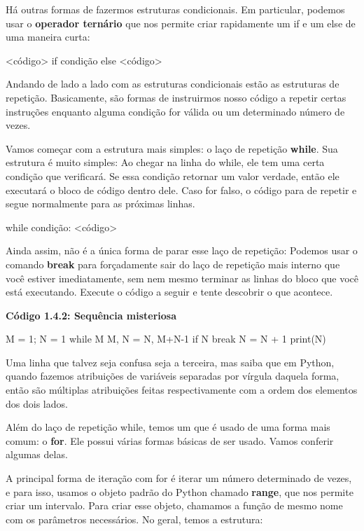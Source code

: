 \documentclass[11pt, a4paper]{article}
\begin{document}
Há outras formas de fazermos estruturas condicionais. Em particular, podemos usar o \textbf{operador ternário} que nos permite criar rapidamente um if e um else de uma maneira curta:

\begin{code}
<código> if condição else <código>
\end{code}

Andando de lado a lado com as estruturas condicionais estão as estruturas de repetição. Basicamente, são formas de instruirmos nosso código a repetir certas instruções enquanto alguma condição for válida ou um determinado número de vezes.

Vamos começar com a estrutura mais simples: o laço de repetição \textbf{while}. Sua estrutura é muito simples: Ao chegar na linha do while, ele tem uma certa condição que verificará. Se essa condição retornar um valor verdade, então ele executará o bloco de código dentro dele. Caso for falso, o código para de repetir e segue normalmente para as próximas linhas.

\begin{code}
while condição:
    <código>
\end{code}

Ainda assim, não é a única forma de parar esse laço de repetição: Podemos usar o comando \textbf{break} para forçadamente sair do laço de repetição mais interno que você estiver imediatamente, sem nem mesmo terminar as linhas do bloco que você está executando. Execute o código a seguir e tente descobrir o que acontece. 

\textbf{Código 1.4.2: Sequência misteriosa}
\begin{code}
M = 1; N = 1
while M %
    M, N = N, M+N-1
    if N %
        break
    N = N + 1
print(N)
\end{code}

Uma linha que talvez seja confusa seja a terceira, mas saiba que em Python, quando fazemos atribuições de variáveis separadas por vírgula daquela forma, então são múltiplas atribuições feitas respectivamente com a ordem dos elementos dos dois lados.

Além do laço de repetição while, temos um que é usado de uma forma mais comum: o \textbf{for}. Ele possui várias formas básicas de ser usado. Vamos conferir algumas delas.

A principal forma de iteração com for é iterar um número determinado de vezes, e para isso, usamos o objeto padrão do Python chamado \textbf{range}, que nos permite criar um intervalo. Para criar esse objeto, chamamos a função de mesmo nome com os parâmetros necessários. No geral, temos a estrutura:
\end{document}
